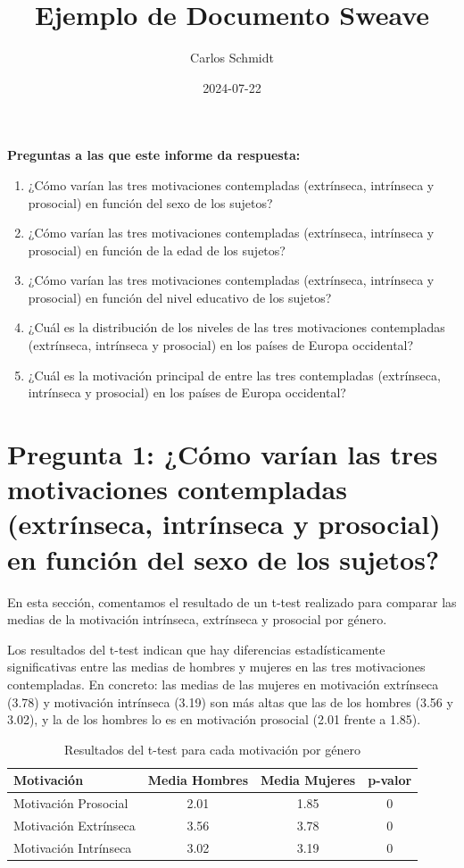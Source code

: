 \documentclass{article}
\title{Ejemplo de Documento Sweave}
\author{Carlos Schmidt}
\date{2024-07-22}
\begin{document}


\maketitle

\textbf{Preguntas a las que este informe da respuesta:}
\begin{enumerate}
    \item ¿Cómo varían las tres motivaciones contempladas (extrínseca, intrínseca y prosocial) en función del sexo de los sujetos?
    \item ¿Cómo varían las tres motivaciones contempladas (extrínseca, intrínseca y prosocial) en función de la edad de los sujetos?
    \item ¿Cómo varían las tres motivaciones contempladas (extrínseca, intrínseca y prosocial) en función del nivel educativo de los sujetos?
    \item ¿Cuál es la distribución de los niveles de las tres motivaciones contempladas (extrínseca, intrínseca y prosocial) en los países de Europa occidental?
    \item ¿Cuál es la motivación principal de entre las tres contempladas (extrínseca, intrínseca y prosocial) en los países de Europa occidental?
\end{enumerate}





\section{Pregunta 1: ¿Cómo varían las tres motivaciones contempladas (extrínseca, intrínseca y prosocial) en función del sexo de los sujetos?
}

En esta sección, comentamos el resultado de un t-test realizado para comparar las medias de la motivación intrínseca, extrínseca y prosocial por género.


Los resultados del t-test indican que hay diferencias estadísticamente significativas entre las medias de hombres y mujeres en las tres motivaciones contempladas. En concreto: las medias de las mujeres en motivación extrínseca (3.78) y motivación intrínseca (3.19) son más altas que las de los hombres (3.56 y 3.02), y la de los hombres lo es en motivación prosocial (2.01 frente a 1.85).

\begin{table}[h!]
\centering
\caption{Resultados del t-test para cada motivación por género}
\begin{tabular}{lccc}
  \toprule
  \textbf{Motivación} & \textbf{Media Hombres} & \textbf{Media Mujeres} & \textbf{p-valor} \\
  \midrule
  Motivación Prosocial & 2.01 & 1.85 & 0 \\
  Motivación Extrínseca & 3.56 & 3.78 & 0 \\
  Motivación Intrínseca & 3.02 & 3.19 & 0 \\
  \bottomrule
\end{tabular}
\end{table}
\end{document}
